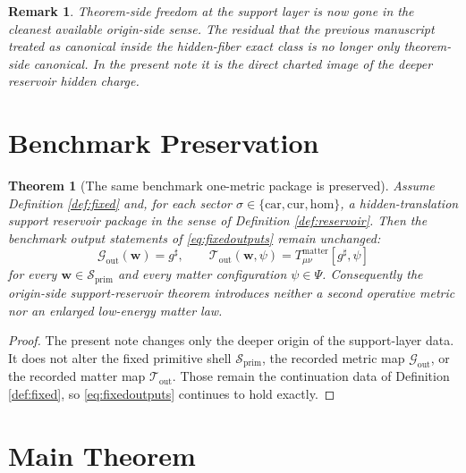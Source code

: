 \documentclass[11pt]{article}
\newcommand{\CompletedMetric}{g^{\sharp}}
\newcommand{\Car}{\mathrm{car}}
\newcommand{\Cur}{\mathrm{cur}}
\newcommand{\Hom}{\mathrm{hom}}
\newcommand{\PrimShell}{\mathcal S_{\mathrm{prim}}}
\newcommand{\MetricOut}{\mathscr G_{\mathrm{out}}}
\newcommand{\MatterOut}{\mathscr T_{\mathrm{out}}}
\newtheorem{remark}{Remark}
\newtheorem{theorem}{Theorem}
\begin{document}
\begin{remark}
Theorem-side freedom at the support layer is now gone in the cleanest available origin-side sense. The residual that the previous manuscript treated as canonical inside the hidden-fiber exact class is no longer only theorem-side canonical. In the present note it is the direct charted image of the deeper reservoir hidden charge.
\end{remark}

\section{Benchmark Preservation}

\begin{theorem}[The same benchmark one-metric package is preserved]
\label{thm:outputs}
Assume Definition \ref{def:fixed} and, for each sector \(\sigma\in\{\Car,\Cur,\Hom\}\), a hidden-translation support reservoir package in the sense of Definition \ref{def:reservoir}. Then the benchmark output statements of \eqref{eq:fixedoutputs} remain unchanged:
\[
\MetricOut(\mathbf w)=\CompletedMetric,
\qquad
\MatterOut(\mathbf w,\psi)
=
T_{\mu\nu}^{\mathrm{matter}}[\CompletedMetric,\psi]
\]
for every \(\mathbf w\in\PrimShell\) and every matter configuration \(\psi\in\Psi\). Consequently the origin-side support-reservoir theorem introduces neither a second operative metric nor an enlarged low-energy matter law.
\end{theorem}

\begin{proof}
The present note changes only the deeper origin of the support-layer data. It does not alter the fixed primitive shell \(\PrimShell\), the recorded metric map \(\MetricOut\), or the recorded matter map \(\MatterOut\). Those remain the continuation data of Definition \ref{def:fixed}, so \eqref{eq:fixedoutputs} continues to hold exactly.
\end{proof}

\section{Main Theorem}
\end{document}
